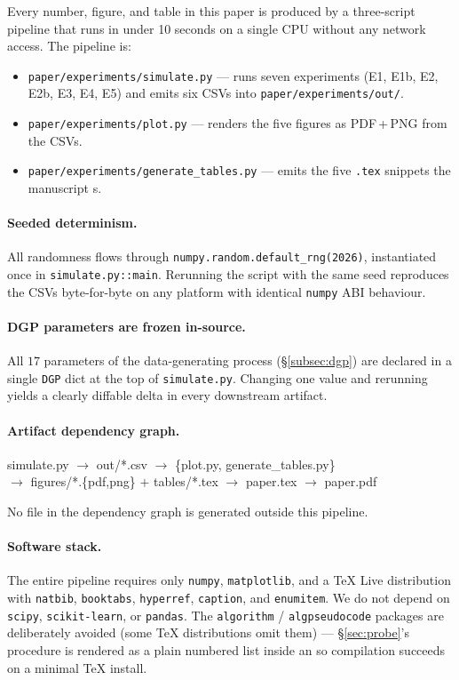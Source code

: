 \documentclass[10pt,a4paper]{article}
\begin{document}
Every number, figure, and table in this paper is produced by a three-script
pipeline that runs in under 10 seconds on a single CPU without any network
access. The pipeline is:
\begin{itemize}[leftmargin=*,topsep=0pt,itemsep=0pt]
  \item \texttt{paper/experiments/simulate.py} --- runs seven experiments
        (E1, E1b, E2, E2b, E3, E4, E5) and emits six CSVs into
        \texttt{paper/experiments/out/}.
  \item \texttt{paper/experiments/plot.py} --- renders the five figures as
        PDF\,+\,PNG from the CSVs.
  \item \texttt{paper/experiments/generate\_tables.py} --- emits the five
        \texttt{.tex} snippets the manuscript \texttt{\string}s.
\end{itemize}

\paragraph{Seeded determinism.} All randomness flows through
\texttt{numpy.random.default\_rng(2026)}, instantiated once in
\texttt{simulate.py::main}. Rerunning the script with the same seed
reproduces the CSVs byte-for-byte on any platform with identical
\texttt{numpy} ABI behaviour.

\paragraph{DGP parameters are frozen in-source.} All $17$ parameters of the
data-generating process (\S\ref{subsec:dgp}) are declared in a single
\texttt{DGP} dict at the top of \texttt{simulate.py}. Changing one value and
rerunning yields a clearly diffable delta in every downstream artifact.

\paragraph{Artifact dependency graph.}
\begin{center}\small\ttfamily
simulate.py $\to$ out/*.csv $\to$ \{plot.py, generate\_tables.py\}\\
$\to$ figures/*.\{pdf,png\} $+$ tables/*.tex $\to$ paper.tex $\to$ paper.pdf
\end{center}
No file in the dependency graph is generated outside this pipeline.

\paragraph{Software stack.} The entire pipeline requires only
\texttt{numpy}, \texttt{matplotlib}, and a TeX Live distribution with
\texttt{natbib}, \texttt{booktabs}, \texttt{hyperref}, \texttt{caption}, and
\texttt{enumitem}. We do not depend on \texttt{scipy},
\texttt{scikit-learn}, or \texttt{pandas}. The \texttt{algorithm} /
\texttt{algpseudocode} packages are deliberately avoided (some TeX
distributions omit them) --- \S\ref{sec:probe}'s procedure is rendered as a
plain numbered list inside an \texttt{\string\fbox} so compilation succeeds
on a minimal TeX install.
\end{document}
